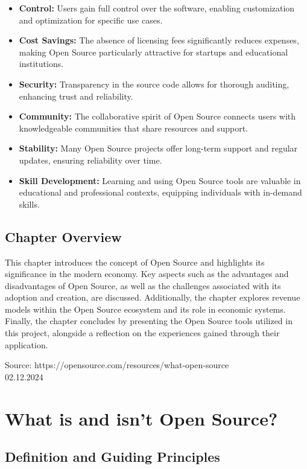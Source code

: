 \begin{itemize}
    \item \textbf{Control:} Users gain full control over the software, enabling customization and optimization for specific use cases.
    \item \textbf{Cost Savings:} The absence of licensing fees significantly reduces expenses, making Open Source particularly attractive for startups and educational institutions.
    \item \textbf{Security:} Transparency in the source code allows for thorough auditing, enhancing trust and reliability.
    \item \textbf{Community:} The collaborative spirit of Open Source connects users with knowledgeable communities that share resources and support.
    \item \textbf{Stability:} Many Open Source projects offer long-term support and regular updates, ensuring reliability over time.
    \item \textbf{Skill Development:} Learning and using Open Source tools are valuable in educational and professional contexts, equipping individuals with in-demand skills.
\end{itemize}


\subsection{Chapter Overview}

This chapter introduces the concept of Open Source and highlights its significance in the modern economy. 
Key aspects such as the advantages and disadvantages of Open Source, as well as the challenges associated with its adoption and creation, are discussed. 
Additionally, the chapter explores revenue models within the Open Source ecosystem and its role in economic systems. 
Finally, the chapter concludes by presenting the Open Source tools utilized in this project, alongside a reflection on the experiences gained through their application.


Source: https://opensource.com/resources/what-open-source \\ 02.12.2024

\section{What is and isn’t Open Source?}

\subsection{Definition and Guiding Principles}

